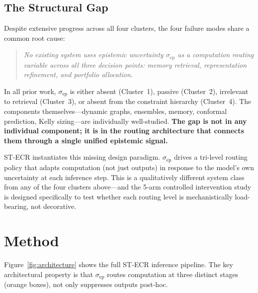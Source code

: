 \documentclass[11pt,a4paper]{article}
\newcommand{\sep}{\sigma_{\mathrm{ep}}}
\begin{document}
\subsection*{The Structural Gap}
\label{sec:gap}

Despite extensive progress across all four clusters, the four failure modes
share a common root cause:

\begin{quote}
\emph{No existing system uses epistemic uncertainty $\sep$ as a computation
routing variable across all three decision points: memory retrieval,
representation refinement, and portfolio allocation.}
\end{quote}

In all prior work, $\sep$ is either absent (Cluster~1), passive (Cluster~2),
irrelevant to retrieval (Cluster~3), or absent from the constraint hierarchy
(Cluster~4).  The components themselves—dynamic graphs, ensembles, memory,
conformal prediction, Kelly sizing—are individually well-studied.
\textbf{The gap is not in any individual component; it is in the routing
architecture that connects them through a single unified epistemic signal.}

ST-ECR instantiates this missing design paradigm.  $\sep$ drives a tri-level
routing policy that adapts computation (not just outputs) in response to the
model's own uncertainty at each inference step.  This is a qualitatively
different system class from any of the four clusters above—and the 5-arm
controlled intervention study is designed specifically to test whether each
routing level is mechanistically load-bearing, not decorative.

\section{Method}
\label{sec:method}

Figure~\ref{fig:architecture} shows the full ST-ECR inference pipeline.
The key architectural property is that $\sep$ routes computation at three
distinct stages (orange boxes), not only suppresses outputs post-hoc.
\end{document}
